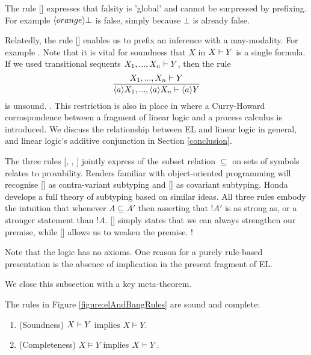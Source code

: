 The rule [] expresses that falsity is 'global'
  and cannot be surpressed by prefixing. For example
  $\langle orange \rangle \bot$ is false, simply because $\bot$ is already
  false.

Relatedly, the rule [] enables us to
prefix an inference with a may-modality. For example . Note that it is vital for soundness that $X$ in $X
\vdash Y$ is a single formula. If we used transitional sequents $X_1, ..., X_n \vdash Y$,
then the rule
\[
   \frac{\displaystyle{ 
     X_1, ..., X_n \vdash Y
    }}{\displaystyle{ 
     \langle a \rangle X_1, ..., \langle a \rangle X_n \vdash\langle a \rangle Y
    }}
\]
is unsound. . This
restriction is also in place in \cite{GaySJ:typcalosp} where a
Curry-Howard corrospondence between a fragment of linear logic
\cite{GirardJY:linlog,GirardJY:protyp} and a process calculus is
introduced. We discuss the relationship between EL and linear logic in
general, and linear logic's additive conjunction in Section
\ref{conclusion}.


The three rules [, ,
  ] jointly express of the subset relation
$\subseteq$ on sets of symbols relates to provability. Readers
familiar with object-oriented programming will recognise
[] as contra-variant subtyping and [] as covariant subtyping. Honda \cite{HondaK:thetypftpc}
develops a full theory of subtyping based on similar ideas.  All three
rules embody the intuition that whenever $A \subseteq A'$ then
asserting that $!A'$ is as strong as, or a stronger statement than
$!A$. [] simply states that we can always strengthen
our premise, while [] allows us to weaken the
premise. !

Note that the logic has no axioms. One reason for a purely rule-based
presentation is the absence of implication in the present fragment of
EL. 

We close this subsection with a key meta-theorem.

\begin{theorem}\label{theorem:elAndBang:soundComplete}
The rules in Figure \ref{figure:elAndBangRules} are sound and complete:
\begin{enumerate}

\item\label{theorem:elAndBang:sound} (Soundness) $X \vdash Y$ implies $X \models Y$.

\item\label{theorem:elAndBang:complete} (Completeness) $X \models Y$ implies $X \vdash Y$.

\end{enumerate}
\end{theorem}

